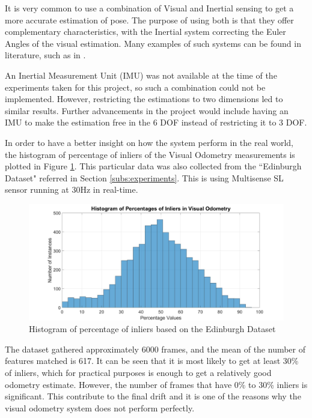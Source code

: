 \documentclass[11pt]{article}
\begin{document}
It is very common to use a combination of Visual and Inertial sensing to get a more accurate estimation of pose. The purpose of using both is that they offer complementary characteristics, with the Inertial system correcting the Euler Angles of the visual estimation. Many examples of such systems can be found in literature, such as in \cite{usenko2016direct}.

An Inertial Measurement Unit (IMU) was not available at the time of the experiments taken for this project, so such a combination could not be implemented. However, restricting the estimations to two dimensions led to similar results. Further advancements in the project would include having an IMU to make the estimation free in the 6 DOF instead of restricting it to 3 DOF.

In order to have a better insight on how the system perform in the real world, the histogram of percentage of inliers of the Visual Odometry measurements is plotted in Figure \ref{fig:PorcentageInliers}. This particular data was also collected from the ``Edinburgh Dataset" referred in Section \ref{subs:experiments}. This is using Multisense SL sensor running at 30Hz in real-time.

\begin{figure}[h]
	\includegraphics[width=\linewidth]{VisualOdometry/PercentageHistogram}
	\caption{Histogram of percentage of inliers based on the Edinburgh Dataset}
	\label{fig:PorcentageInliers}
\end{figure}

The dataset gathered approximately 6000 frames, and the mean of the number of features matched is 617. It can be seen that it is most likely to get at least 30\% of inliers, which for practical purposes is enough to get a relatively good odometry estimate. However, the number of frames that have 0\% to 30\% inliers is significant. This contribute to the final drift and it is one of the reasons why the visual odometry system does not perform perfectly.
\end{document}
